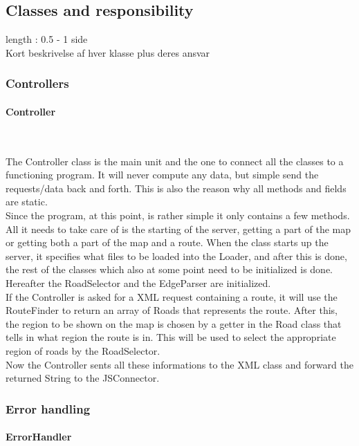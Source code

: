 \documentclass[a4paper,10pt,titlepage]{article}
\begin{document}
		\newpage
		\subsection{Classes and responsibility}
			length : 0.5 - 1 side\\
			Kort beskrivelse af hver klasse plus deres ansvar\\
			
			\subsubsection{Controllers}
			
				\paragraph{Controller}\mbox{}\
				
The Controller class is the main unit and the one to connect all the classes to a functioning program. It will never compute any data, but simple send the requests/data back and forth.  This is also the reason why all methods and fields are static.\\
Since the program, at this point, is rather simple it only contains a few methods. All it needs to take care of is the starting of the server, getting a part of the map or getting both a part of the map and a route. When the class starts up the server, it specifies what files to be loaded into the Loader, and after this is done, the rest of the classes which also at some point need to be initialized is done. Hereafter the RoadSelector and the EdgeParser are initialized.\\
If the Controller is asked for a XML request containing a route, it will use the RouteFinder to return an array of Roads that represents the route. After this, the region to be shown on the map is chosen by a getter in the Road class that tells in what region the route is in. This will be used to select the appropriate region of roads by the RoadSelector.\\
Now the Controller sents all these informations to the XML class and forward the returned String to the JSConnector.\\


					
			\subsubsection{Error handling}
				
				\paragraph{ErrorHandler}\mbox{}\
\end{document}
